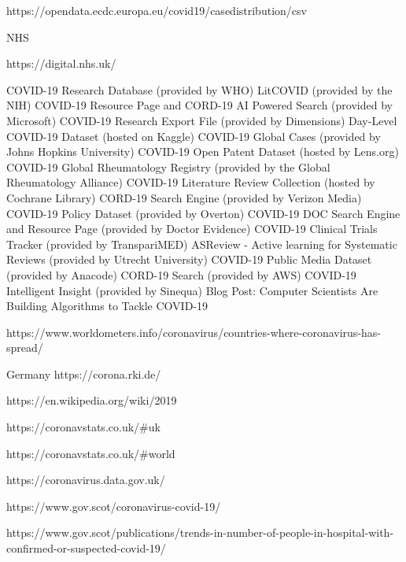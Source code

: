 https://opendata.ecdc.europa.eu/covid19/casedistribution/csv

NHS

https://digital.nhs.uk/


COVID-19 Research Database (provided by WHO)
LitCOVID (provided by the NIH)
COVID-19 Resource Page and CORD-19 AI Powered Search (provided by Microsoft)
COVID-19 Research Export File (provided by Dimensions)
Day-Level COVID-19 Dataset (hosted on Kaggle)
COVID-19 Global Cases (provided by Johns Hopkins University)
COVID-19 Open Patent Dataset (hosted by Lens.org)
COVID-19 Global Rheumatology Registry (provided by the Global Rheumatology Alliance)
COVID-19 Literature Review Collection (hosted by Cochrane Library)
CORD-19 Search Engine (provided by Verizon Media)
COVID-19 Policy Dataset (provided by Overton)
COVID-19 DOC Search Engine and Resource Page (provided by Doctor Evidence)
COVID-19 Clinical Trials Tracker (provided by TranspariMED)
ASReview - Active learning for Systematic Reviews (provided by Utrecht University)
COVID-19 Public Media Dataset (provided by Anacode)
CORD-19 Search (provided by AWS)
COVID-19 Intelligent Insight (provided by Sinequa)
Blog Post: Computer Scientists Are Building Algorithms to Tackle COVID-19


https://www.worldometers.info/coronavirus/countries-where-coronavirus-has-spread/

Germany
https://corona.rki.de/

https://en.wikipedia.org/wiki/2019%


https://coronavstats.co.uk/#uk

https://coronavstats.co.uk/#world

https://coronavirus.data.gov.uk/


https://www.gov.scot/coronavirus-covid-19/

https://www.gov.scot/publications/trends-in-number-of-people-in-hospital-with-confirmed-or-suspected-covid-19/


